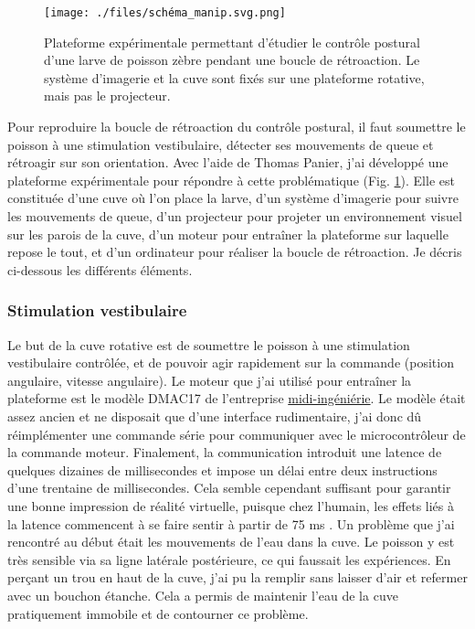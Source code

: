 \begin{figure}[b!]
    \centering
    \texttt{[image: ./files/schéma\_manip.svg.png]}
    \caption{Plateforme expérimentale permettant d'étudier le contrôle postural d'une larve de poisson zèbre pendant une boucle de rétroaction. Le système d'imagerie et la cuve sont fixés sur une plateforme rotative, mais pas le projecteur.
    \label{FIGexpplatformbehavior}}
    \end{figure}

Pour reproduire la boucle de rétroaction du contrôle postural, il faut soumettre le poisson à une stimulation vestibulaire, détecter ses mouvements de queue et rétroagir sur son orientation. Avec l'aide de Thomas Panier, j'ai développé une plateforme expérimentale pour répondre à cette problématique (Fig. \ref{FIGexpplatformbehavior}). Elle est constituée d'une cuve où l'on place la larve, d'un système d'imagerie pour suivre les mouvements de queue, d'un projecteur pour projeter un environnement visuel sur les parois de la cuve, d'un moteur pour entraîner la plateforme sur laquelle repose le tout, et d'un ordinateur pour réaliser la boucle de rétroaction. Je décris ci-dessous les différents éléments.

\subsubsection{Stimulation vestibulaire}

Le but de la cuve rotative est de soumettre le poisson à une stimulation vestibulaire contrôlée, et de pouvoir agir rapidement sur la commande (position angulaire, vitesse angulaire). Le moteur que j'ai utilisé pour entraîner la plateforme est le modèle DMAC17 de l'entreprise \href{http://www.midi-ingenierie.com/}{midi-ingéniérie}. Le modèle était assez ancien et ne disposait que d'une interface rudimentaire, j'ai donc dû réimplémenter une commande série pour communiquer avec le microcontrôleur de la commande moteur. Finalement, la communication introduit une latence de quelques dizaines de millisecondes et impose un délai entre deux instructions d'une trentaine de millisecondes. Cela semble cependant suffisant pour garantir une bonne impression de réalité virtuelle, puisque chez l'humain, les effets liés à la latence commencent à se faire sentir à partir de 75 ms \cite{waltemate_impact_2016}. Un problème que j'ai rencontré au début était les mouvements de l'eau dans la cuve. Le poisson y est très sensible via sa ligne latérale postérieure, ce qui faussait les expériences. En perçant un trou en haut de la cuve, j'ai pu la remplir sans laisser d'air et refermer avec un bouchon étanche. Cela a permis de maintenir l'eau de la cuve pratiquement immobile et de contourner ce problème.

